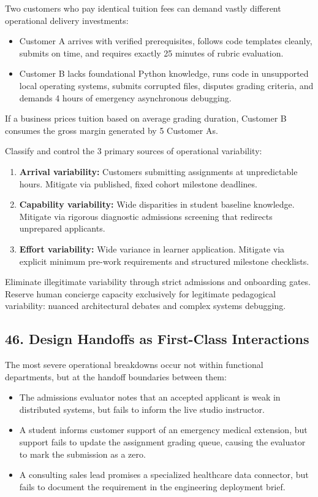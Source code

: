 Two customers who pay identical tuition fees can demand vastly different operational delivery investments:
\begin{itemize}
    \item Customer A arrives with verified prerequisites, follows code templates cleanly, submits on time, and requires exactly 25 minutes of rubric evaluation.
    \item Customer B lacks foundational Python knowledge, runs code in unsupported local operating systems, submits corrupted files, disputes grading criteria, and demands 4 hours of emergency asynchronous debugging.
\end{itemize}

If a business prices tuition based on average grading duration, Customer B consumes the gross margin generated by 5 Customer As.

Classify and control the 3 primary sources of operational variability:
\begin{enumerate}
    \item \textbf{Arrival variability:} Customers submitting assignments at unpredictable hours. Mitigate via published, fixed cohort milestone deadlines.
    \item \textbf{Capability variability:} Wide disparities in student baseline knowledge. Mitigate via rigorous diagnostic admissions screening that redirects unprepared applicants.
    \item \textbf{Effort variability:} Wide variance in learner application. Mitigate via explicit minimum pre-work requirements and structured milestone checklists.
\end{enumerate}

Eliminate illegitimate variability through strict admissions and onboarding gates. Reserve human concierge capacity exclusively for legitimate pedagogical variability: nuanced architectural debates and complex systems debugging.

\subsection*{46. Design Handoffs as First-Class Interactions}

The most severe operational breakdowns occur not within functional departments, but at the handoff boundaries between them:
\begin{itemize}
    \item The admissions evaluator notes that an accepted applicant is weak in distributed systems, but fails to inform the live studio instructor.
    \item A student informs customer support of an emergency medical extension, but support fails to update the assignment grading queue, causing the evaluator to mark the submission as a zero.
    \item A consulting sales lead promises a specialized healthcare data connector, but fails to document the requirement in the engineering deployment brief.
\end{itemize}

